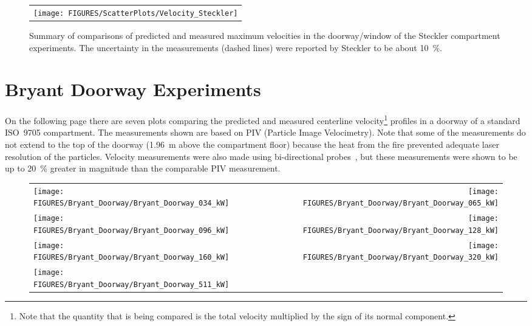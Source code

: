 \begin{figure}[p]
\begin{center}
\begin{tabular}{l}
\texttt{[image: FIGURES/ScatterPlots/Velocity\_Steckler]}
\end{tabular}
\end{center}
\caption[Summary of velocity predictions, Steckler compartment experiments.]
{Summary of comparisons of predicted and measured maximum velocities in the doorway/window of the Steckler compartment experiments. The uncertainty
in the measurements (dashed lines) were reported by Steckler to be about 10~\%.}
\label{Steckler_Scatterplot}
\end{figure}


\clearpage

\section{Bryant Doorway Experiments}

On the following page there are seven plots comparing the predicted and measured centerline velocity\footnote{Note that the quantity
that is being compared is the total velocity multiplied by the sign of its normal component.} profiles
in a doorway of a standard ISO~9705 compartment. The measurements shown are based on PIV (Particle Image Velocimetry).
Note that some of the measurements do not extend to the top of the
doorway (1.96~m above the compartment floor) because the heat from the fire prevented adequate laser resolution of
the particles. Velocity measurements were also made using bi-directional probes~\cite{Bryant:FSJ2009}, but these
measurements were shown to be up to 20~\% greater in magnitude than the comparable PIV measurement.



\begin{figure}[p]
\begin{tabular*}{\textwidth}{l@{\extracolsep{\fill}}r}
\texttt{[image: FIGURES/Bryant\_Doorway/Bryant\_Doorway\_034\_kW]} &
\texttt{[image: FIGURES/Bryant\_Doorway/Bryant\_Doorway\_065\_kW]} \\
\texttt{[image: FIGURES/Bryant\_Doorway/Bryant\_Doorway\_096\_kW]} &
\texttt{[image: FIGURES/Bryant\_Doorway/Bryant\_Doorway\_128\_kW]} \\
\texttt{[image: FIGURES/Bryant\_Doorway/Bryant\_Doorway\_160\_kW]} &
\texttt{[image: FIGURES/Bryant\_Doorway/Bryant\_Doorway\_320\_kW]} \\
\texttt{[image: FIGURES/Bryant\_Doorway/Bryant\_Doorway\_511\_kW]} &
\end{tabular*}
\label{Bryant_Doorway}
\end{figure}


